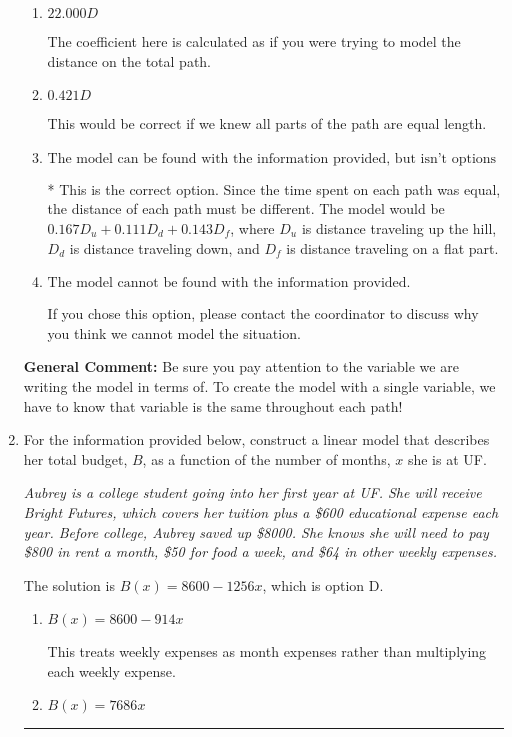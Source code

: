 \documentclass{extbook}[14pt]
\newcommand{\litem}[1]{\item #1

\rule{\textwidth}{0.4pt}}
\begin{document}
\begin{enumerate}
{\begin{enumerate}[label=\Alph*.]
The coefficient here is calculated by multiplying the distances together rather than adding.
\item \( 22.000 D \)

The coefficient here is calculated as if you were trying to model the distance on the total path.
\item \( 0.421 D \)

This would be correct if we knew all parts of the path are equal length.
\item \( \text{The model can be found with the information provided, but isn't options 1-3.} \)

* This is the correct option. Since the time spent on each path was equal, the distance of each path must be different. The model would be $0.167D_u + 0.111D_d + 0.143D_f$, where $D_u$ is distance traveling up the hill, $D_d$ is distance traveling down, and $D_f$ is distance traveling on a flat part.
\item \( \text{The model cannot be found with the information provided.} \)

If you chose this option, please contact the coordinator to discuss why you think we cannot model the situation.
\end{enumerate}

\textbf{General Comment:} Be sure you pay attention to the variable we are writing the model in terms of. To create the model with a single variable, we have to know that variable is the same throughout each path!
}
\litem{
For the information provided below, construct a linear model that describes her total budget, $B$, as a function of the number of months, $x$ she is at UF.

\begin{center}
    \textit{ Aubrey is a college student going into her first year at UF. She will receive Bright Futures, which covers her tuition plus a \$600 educational expense each year. Before college, Aubrey saved up \$8000. She knows she will need to pay \$800 in rent a month, \$50 for food a week, and \$64 in other weekly expenses. }
\end{center}
The solution is \( B(x) = 8600 - 1256 x \), which is option D.\begin{enumerate}[label=\Alph*.]
\item \( B(x) = 8600 - 914 x \)

This treats weekly expenses as month expenses rather than multiplying each weekly expense.
\item \( B(x) = 7686 x \)


\end{enumerate}}
\end{enumerate}
\end{document}
